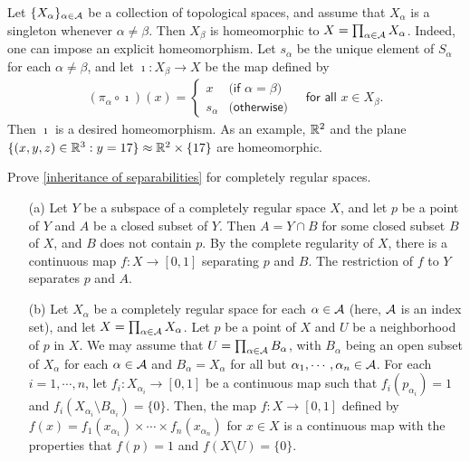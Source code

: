 \begin{rmk}
    Let $\{X_\alpha\}_{\alpha\in{\mathcal{A}}}$ be a collection of topological spaces, and assume that $X_\alpha$ is a singleton whenever $\alpha\neq\beta$.
    Then $X_\beta$ is homeomorphic to $X=\prod_{\alpha\in{\mathcal{A}}} X_\alpha$.
    Indeed, one can impose an explicit homeomorphism.
    Let $s_\alpha$ be the unique element of $S_\alpha$ for each $\alpha\neq\beta$, and let $\imath: X_\beta\rightarrow X$ be the map defined by
    \begin{align*}
        (\pi_\alpha\circ\imath)(x)=\left\{\begin{array}{cc}
            x   &   \textsf{(if $\alpha=\beta$)}\\
            s_\alpha    &   \textsf{(otherwise)}
        \end{array}\right.
        \quad
        \textsf{for all $x\in X_\beta$}.
    \end{align*}
    Then $\imath$ is a desired homeomorphism.
    As an example, ${\mathbb{R}}^2$ and the plane $\{(x, y, z)\in{\mathbb{R}}^3: y=17\}\approx{\mathbb{R}}^2\times\{17\}$ are homeomorphic.
\end{rmk}

\begin{prob}\label{inheritance: completely regular}
    Prove \cref{inheritance of separabilities} for completely regular spaces.
\end{prob}
\begin{sol}
    \begin{enumerate}
        \item[(a)]
        {
            Let $Y$ be a subspace of a completely regular space $X$, and let $p$ be a point of $Y$ and $A$ be a closed subset of $Y$.
            Then $A=Y\cap B$ for some closed subset $B$ of $X$, and $B$ does not contain $p$.
            By the complete regularity of $X$, there is a continuous map $f: X\rightarrow [0, 1]$ separating $p$ and $B$.
            The restriction of $f$ to $Y$ separates $p$ and $A$.
        }
        \item[(b)]
        {
            Let $X_\alpha$ be a completely regular space for each $\alpha\in{\mathcal{A}}$ (here, ${\mathcal{A}}$ is an index set), and let $X=\prod_{\alpha\in{\mathcal{A}}} X_\alpha$.
            Let $p$ be a point of $X$ and $U$ be a neighborhood of $p$ in $X$.
            We may assume that $U=\prod_{\alpha\in{\mathcal{A}}} B_\alpha$, with $B_\alpha$ being an open subset of $X_\alpha$ for each $\alpha\in{\mathcal{A}}$ and $B_\alpha=X_\alpha$ for all but $\alpha_1, \cdots, \alpha_n\in{\mathcal{A}}$.
            For each $i=1, \cdots, n$, let $f_i: X_{\alpha_i}\rightarrow [0, 1]$ be a continuous map such that $f_i(p_{\alpha_i})=1$ and $f_i(X_{\alpha_i}\setminus B_{\alpha_i})=\{0\}$.
            Then, the map $f: X\rightarrow [0, 1]$ defined by $f(x)=f_1(x_{\alpha_1})\times\cdots\times f_n(x_{\alpha_n})$ for $x\in X$ is a continuous map with the properties that $f(p)=1$ and $f(X\setminus U)=\{0\}$.
        }
    \end{enumerate}
\end{sol}

